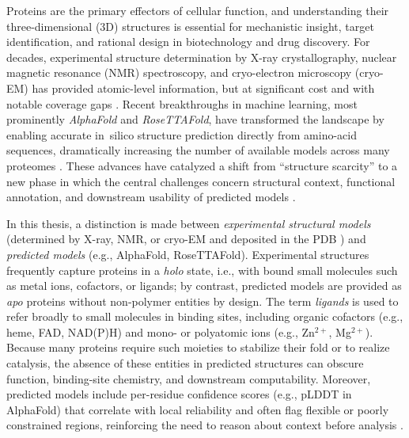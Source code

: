 
\label{chap:introduction}

Proteins are the primary effectors of cellular function, and understanding their three-dimensional (3D) structures is essential for mechanistic insight, target identification, and rational design in biotechnology and drug discovery. For decades, experimental structure determination by X-ray crystallography, nuclear magnetic resonance (NMR) spectroscopy, and cryo-electron microscopy (cryo-EM) has provided atomic-level information, but at significant cost and with notable coverage gaps \cite{monteirodasilvaHighthroughputPredictionProtein2024}. Recent breakthroughs in machine learning, most prominently \textit{AlphaFold} and \textit{RoseTTAFold}, have transformed the landscape by enabling accurate in~silico structure prediction directly from amino-acid sequences, dramatically increasing the number of available models across many proteomes \cite{jumperHighlyAccurateProtein2021, baekAccuratePredictionProtein2021,tunyasuvunakoolHighlyAccurateProtein2021}. These advances have catalyzed a shift from ``structure scarcity'' to a new phase in which the central challenges concern structural context, functional annotation, and downstream usability of predicted models \cite{porta-pardoStructuralCoverageHuman2022}.

In this thesis, a distinction is made between \emph{experimental structural models} (determined by X-ray, NMR, or cryo-EM and deposited in the PDB \cite{burleyRCSBProteinData2019}) and \emph{predicted models} (e.g., AlphaFold, RoseTTAFold). Experimental structures frequently capture proteins in a \emph{holo} state, i.e., with bound small molecules such as metal ions, cofactors, or ligands; by contrast, predicted models are provided as \emph{apo} proteins without non-polymer entities by design. The term \emph{ligands} is used to refer broadly to small molecules in binding sites, including organic cofactors (e.g., heme, FAD, NAD(P)H) and mono- or polyatomic ions (e.g., Zn$^{2+}$, Mg$^{2+}$). Because many proteins require such moieties to stabilize their fold or to realize catalysis, the absence of these entities in predicted structures can obscure function, binding-site chemistry, and downstream computability. Moreover, predicted models include per-residue confidence scores (e.g., pLDDT in AlphaFold) that correlate with local reliability and often flag flexible or poorly constrained regions, reinforcing the need to reason about context before analysis \cite{jumperHighlyAccurateProtein2021, burleyRCSBProteinData2019, hekkelmanAlphaFillEnrichingAlphaFold2023}.

